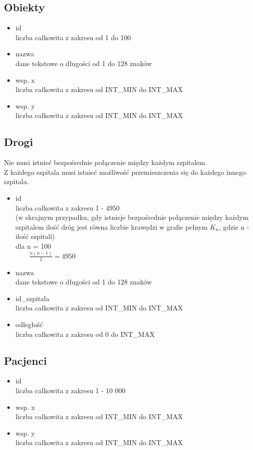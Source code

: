 \documentclass[a4paper,12pt,twoside]{article}
\begin{document}
\subsection{Obiekty}
\begin{itemize}
\item id\\liczba całkowita z zakresu od 1 do 100
\item nazwa\\dane tekstowe o długości od 1 do 128 znaków
\item wsp. x\\liczba całkowita z zakresu od INT\_MIN do INT\_MAX
\item wsp. y\\liczba całkowita z zakresu od INT\_MIN do INT\_MAX
\end{itemize}
\newpage
\subsection{Drogi}
 Nie musi istnieć bezpośrednie połączenie między każdym szpitalem.\\Z każdego szpitala musi istnieć możliwość przemieszczenia się do każdego innego szpitala.
\begin{itemize}
\item id\\liczba całkowita z zakresu 1 - 4950
\\(w skrajnym przypadku, gdy istnieje bezpośrednie połączenie między każdym szpitalem ilość dróg
jest równa liczbie krawędzi w grafie pełnym $K_n$, gdzie n - ilość szpitali)\\dla n = 100
\\${\qquad\frac{n(n-1)}{2}} = 4950$
\item nazwa\\dane tekstowe o długości od 1 do 128 znaków
\item id\_szpitala\\liczba całkowita z zakresu od INT\_MIN do INT\_MAX
\item odległość\\liczba całkowita z zakresu od 0 do INT\_MAX
\end{itemize}
\subsection{Pacjenci}
\begin{itemize}
\item id\\liczba całkowita z zakresu 1 - 10 000
\item wsp. x\\liczba całkowita z zakresu od INT\_MIN do INT\_MAX
\item wsp. y\\liczba całkowita z zakresu od INT\_MIN do INT\_MAX
\end{itemize}
\end{document}
